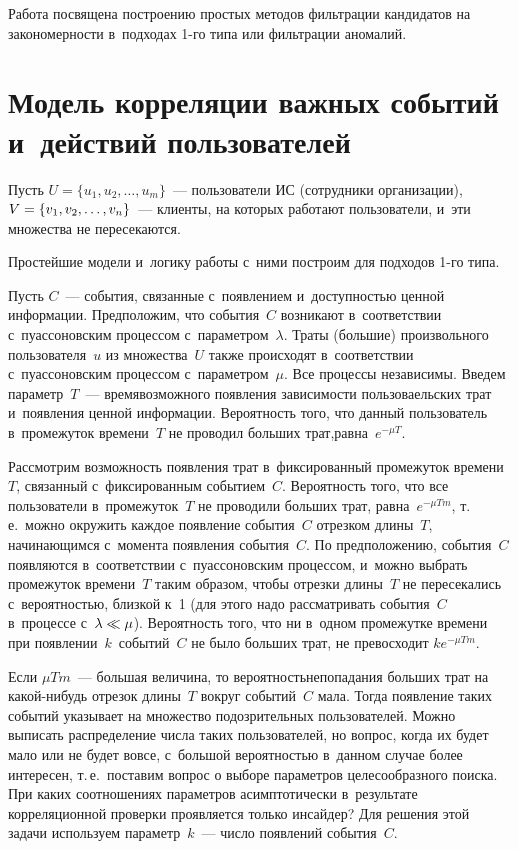 \begin{multicols}{2}
  Работа посвящена построению простых методов фильтрации кандидатов на 
закономерности в~подходах 1-го типа или фильтрации аномалий.
  
\section{Модель корреляции важных событий и~действий пользователей}

  Пусть $U=\{ u_1, u_2, \ldots, u_m\}$~--- пользователи ИС (сотрудники 
организации), $V\hm= \{ v_1, v_2, \ldots , v_n\}$~--- клиенты, на которых 
работают пользователи, и~эти множества не пересекаются. 
  
  Простейшие модели и~логику работы с~ними построим для подходов 1-го 
типа.
  
  Пусть $C$~--- события, связанные с~появлением и~доступностью ценной 
информации. Предположим, что события~$C$ возникают в~соответствии 
с~пуассоновским процессом с~параметром~$\lambda$. Траты (большие) 
произвольного пользователя~$u$ из множества~$U$ также происходят 
в~соответствии с~пуассоновским процессом с~параметром~$\mu$. Все процессы 
независимы. Введем параметр~$T$~--- время\linebreak возможного появления 
зависимости поль\-зо\-ва\-ельских трат и~появления ценной информации.\linebreak 
Вероятность того, что данный пользователь в~промежуток времени~$T$ не 
проводил больших трат,\linebreak рав\-на~$e^{-\mu T}$.
{ %

}
  
  Рассмотрим возможность появления трат в~фиксированный промежуток 
времени~$T$, связанный с~фиксированным событием~$C$. Вероятность того, 
что все пользователи в~промежуток~$T$ не проводили больших трат, 
равна~$e^{-\mu Tm}$, т.\,е.\ можно окружить каждое появление события~$C$ 
отрезком длины~$T$, начинающимся с~момента появления события~$C$. По 
предположению, события~$C$ появляются в~соответствии с~пуассоновским 
процессом, и~можно выбрать промежуток времени~$T$ таким образом, чтобы 
отрезки длины~$T$ не пересекались с~вероятностью, близкой к~1 (для этого 
надо рассматривать события~$C$ в~процессе с~$\lambda\hm\ll \mu$). 
Вероятность того, что ни в~одном промежутке времени при 
появлении~$k$~событий~$C$ не было больших трат, не превосходит $ke^{-\mu Tm}$.
  
  Если $\mu Tm$~--- большая величина, то вероятность\linebreak непопадания больших 
трат на ка\-кой-ни\-будь отрезок длины~$T$ вокруг событий~$C$ мала. Тогда 
появление таких событий указывает на множество подозрительных 
пользователей. Можно выписать распределе\-ние числа таких пользователей, но 
вопрос, когда их будет мало или не будет вовсе, с~большой вероятностью 
в~данном случае более интересен, т.\,е.\ поставим вопрос о выборе параметров 
целесообразного поиска. При каких соотношениях параметров асимптотически 
в~результате корреляционной проверки проявляется только инсайдер? Для 
решения этой задачи используем параметр~$k$~--- число появлений 
события~$C$.
  

\end{multicols}

